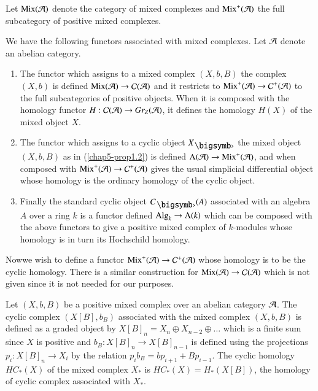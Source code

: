 Let $\operatorname{Mix}(\mathcal{A})$ denote the category of mixed complexes and
$\operatorname{Mix}^{+}(\mathcal{A})$ the full subcategory of positive mixed complexes.

\begin{remark}\label{chap5-rem2.2}
We have the following functors associated with mixed complexes. Let
$\mathcal{A}$ denote an abelian category.
\begin{enumerate}
\renewcommand{\labelenumi}{(\theenumi)}
\item The functor which assigns to a mixed complex $(X,b,B)$ the
  complex $(X,b)$ is defined $\operatorname{Mix}(\mathcal{A})\to \mathcal{C}(\mathcal{A})$ and it restricts to
  $\Mix^{+}\break(\A)\to \C^{+}(\A)$ to the full subcategories of positive
  objects. When it is composed with the homology functor $H:\mathcal{C}(\mathcal{A})\to
  Gr_{Z}(\mathcal{A})$, it defines the homology $H(X)$ of the mixed object $X$.

\item The functor which assigns to a cyclic object $X_{\bigdot}$ the
  mixed object $(X,b,B)$ as in (\ref{chap5-prop1.2}) is defined
  $\Lambda(\mathcal{A})\to \operatorname{Mix}^{+}(\mathcal{A})$, and when composed with
  $\operatorname{Mix}^{+}(\mathcal{A})\to \mathcal{C}^{+}(\mathcal{A})$ gives the usual simplicial differential
  object whose homology is the ordinary homology of the cyclic object.

\item Finally the standard cyclic object $C_{\bigdot}(A)$ associated
  with an algebra $A$ over a ring $k$ is a functor defined
  $\operatorname{Alg}_{k}\to \Lambda(k)$ which can be composed with the above
  functors to give a positive mixed complex of $k$-modules whose
  homology is in turn its Hochschild homology.
\end{enumerate}

Now\pageoriginale we wish to define a functor $\operatorname{Mix}^{+}(\mathcal{A})\to
\mathcal{C}^{+}(\mathcal{A})$ whose homology is to be the cyclic homology. There is a
similar construction for $\operatorname{Mix}(\mathcal{A})\to \mathcal{C}(\mathcal{A})$ which is not given since
it is not needed for our purposes.
\end{remark}

\begin{definition}\label{chap5-defi2.3}
Let $(X,b,B)$ be a positive mixed complex over an abelian category
$\mathcal{A}$. The cyclic complex $(X[B],b_{B})$ associated with the mixed
complex $(X,b,B)$ is defined as a graded object by
$X[B]_{n}=X_{n}\oplus X_{n-2}\oplus\ldots$ which is a finite sum since
$X$ is positive and $b_{B}:X[B]_{n}\to X[B]_{n-1}$ is defined using
the projections $p_{i}:X[B]_{n}\to X_{i}$ by the relation
$p_{i}b_{B}=bp_{i+1}+Bp_{i-1}$. The cyclic homology $HC_{\ast}(X)$ of
the mixed complex $X_{\ast}$ is $HC_{\ast}(X)=H_{\ast}(X[B])$, the
homology of cyclic complex associated with $X_{\ast}$.
\end{definition}

